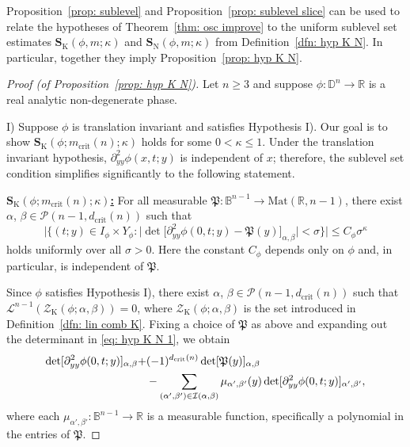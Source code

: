 \documentclass[reqno]{amsart}
\numberwithin{equation}{section}
\newcommand{\B}{\mathbb{B}}
\newcommand{\D}{\mathbb{D}}
\newcommand{\R}{\mathbb{R}}
\newcommand{\cI}{\mathcal{I}}
\newcommand{\cL}{\mathcal{L}}
\newcommand{\cP}{\mathcal{P}}
\newcommand{\cZ}{\mathcal{Z}}
\newcommand{\bS}{\mathbf{S}}
\newcommand{\fP}{\mathfrak{P}}
\theoremstyle{plain}
\theoremstyle{definition}
\newcommand{\tK}{\mathrm{K}}
\newcommand{\tN}{\mathrm{N}}
\newcommand{\crit}{\mathrm{crit}}
\begin{document}

Proposition~\ref{prop: sublevel} and Proposition~\ref{prop: sublevel slice} can be used to relate the hypotheses of Theorem~\ref{thm: osc improve} to the uniform sublevel set estimates $\bS_{\tK}(\phi, m; \kappa)$ and $\bS_{\tN}(\phi, m; \kappa)$ from Definition~\ref{dfn: hyp K N}. In particular, together they imply Proposition~\ref{prop: hyp K N}. 

\begin{proof}[Proof (of Proposition~\ref{prop: hyp K N})] Let $n \geq 3$ and suppose 
 $\phi \colon \D^n \to \R$ is a real analytic non-degenerate phase.\medskip

 \noindent I) Suppose $\phi$ is translation invariant and satisfies Hypothesis I). Our goal is to show $\bS_{\tK}(\phi; m_{\crit}(n); \kappa)$ holds for some $0 < \kappa \leq 1$. Under the translation invariant hypothesis, $\partial^2_{yy}\phi(x,t;y)$ is independent of $x$; therefore, the sublevel set condition simplifies significantly to the following statement.\medskip

\noindent \underline{\textbf{$\bS_{\tK}(\phi; m_{\crit}(n); \kappa)$:}}   For all measurable $\fP \colon \B^{n-1} \to \mathrm{Mat}(\R, n-1)$, there exist $\alpha$, $\beta \in \cP(n-1,d_{\crit}(n))$ such that
\begin{equation}\label{eq: hyp K N 1}
    \Big|\Big\{ (t;y) \in I_{\phi} \times Y_{\phi} : \Big|\det\Big[ \partial_{yy}^2 \phi(0,t;y) - \fP(y) \Big]_{\alpha, \beta} \Big| < \sigma \Big\}\Big| \leq C_{\phi} \sigma^{\kappa}
\end{equation}
holds uniformly over all $\sigma > 0$. Here the constant $C_{\phi}$ depends only on $\phi$ and, in particular, is independent of $\fP$. \medskip


Since $\phi$ satisfies Hypothesis I), there exist $\alpha$, $\beta \in \cP(n-1, d_{\crit}(n))$ such that $\cL^{n-1}(\cZ_{\mathrm{K}}(\phi; \alpha, \beta)) = 0$, where $\cZ_{\mathrm{K}}(\phi; \alpha, \beta)$ is the set introduced in Definition~\ref{dfn: lin comb K}. Fixing a choice of $\fP$ as above and expanding out the determinant in \eqref{eq: hyp K N 1}, we obtain
\begin{align*}
    \det [\partial_{yy}^2 \phi(0,t;y)]_{\alpha, \beta} +&(-1)^{d_{\rm crit}(n)}\det [\fP(y)]_{\alpha,\beta}\\
    &- \sum_{(\alpha', \beta') \in \cI(\alpha,\beta)} \mu_{\alpha', \beta'}(y) \det[\partial^2_{yy}\phi(0,t;y)]_{\alpha', \beta'},
\end{align*}
where each $\mu_{\alpha', \beta'} \colon \B^{n-1} \to \R$ is a measurable function, specifically a polynomial in the entries of $\fP$. 



\end{proof}
\end{document}

